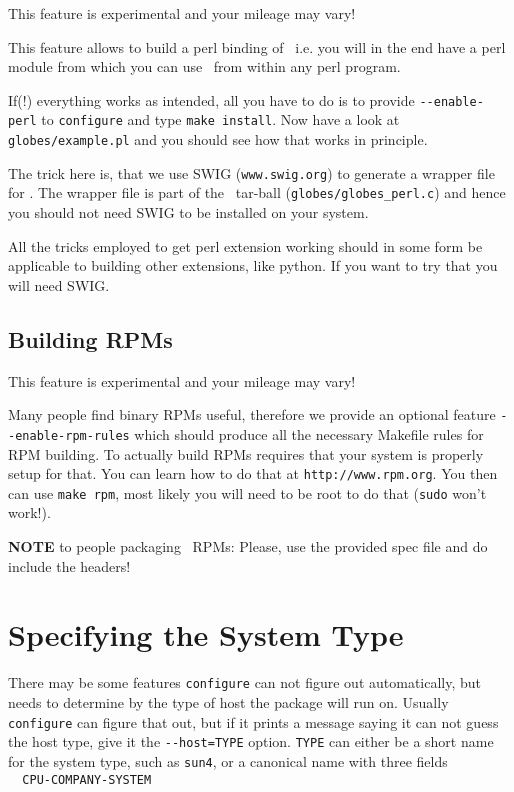 This feature is experimental and your mileage may vary!

This feature allows to build a perl binding of \GLOBES\, i.e. you will
in the end have a perl module from which you can use \GLOBES\ from within
any perl program.

If(!) everything works as intended, all you have to do is to provide
\verb+--enable-perl+ to \verb+configure+ and type \verb+make install+. Now have a
look at \verb+globes/example.pl+ and you should see how that works in
principle. 

The trick here is, that we use SWIG (\verb+www.swig.org+) to generate
a wrapper file for \GLOBES. The wrapper file is part of the \GLOBES\
tar-ball (\verb+globes/globes_perl.c+) and hence you should not need SWIG to
be installed on your system.

All the tricks employed to get perl extension working should in some
form be applicable to building other extensions, like python. If
you want to try that you will need SWIG.

\subsection*{Building RPMs}


This feature is experimental and your mileage may vary!

Many people find binary RPMs useful, therefore we provide an optional
feature \verb+--enable-rpm-rules+ which should produce all the necessary
Makefile rules for RPM building. To actually build RPMs requires that
your system is properly setup for that. You can learn how to do that
at \verb+http://www.rpm.org+. You then can use \verb+make rpm+, most likely
you will need to be root to do that (\verb+sudo+ won't work!).

{\bf NOTE} to people packaging \GLOBES\ RPMs: Please, use the provided spec
file and do include the headers!

\section*{Specifying the System Type}


   There may be some features \verb+configure+ can not figure out
automatically, but needs to determine by the type of host the package
will run on.  Usually \verb+configure+ can figure that out, but if it prints
a message saying it can not guess the host type, give it the
\verb+--host=TYPE+ option. \verb+TYPE+ can either be a short name for the system
type, such as \verb+sun4+, or a canonical name with three fields\\
\verb+  CPU-COMPANY-SYSTEM+

